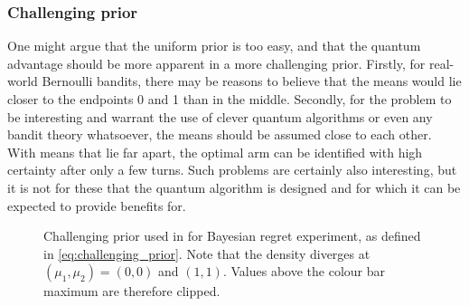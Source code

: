 \clearpage


\subsubsection{Challenging prior}
One might argue that the uniform prior is too easy, and that the quantum advantage should be more apparent in a more challenging prior.
Firstly, for real-world Bernoulli bandits, there may be reasons to believe that the means would lie closer to the endpoints 0 and 1 than in the middle.
Secondly, for the problem to be interesting and warrant the use of clever quantum algorithms or even any bandit theory whatsoever, the means should be assumed close to each other.
With means that lie far apart, the optimal arm can be identified with high certainty after only a few turns.
Such problems are certainly also interesting, but it is not for these that the quantum algorithm is designed and for which it can be expected to provide benefits for.

\begin{figure}[p]
    \centering
    \caption[
        Challenging prior used in Bayesian regret experiment.
    ]
    {
        Challenging prior used in for Bayesian regret experiment, as defined in \cref{eq:challenging_prior}.
        Note that the density diverges at $(\mu_1, \mu_2) = (0, 0)$ and $(1, 1)$.
        Values above the colour bar maximum are therefore clipped.
    }
    \label{fig:prior1}
\end{figure}

